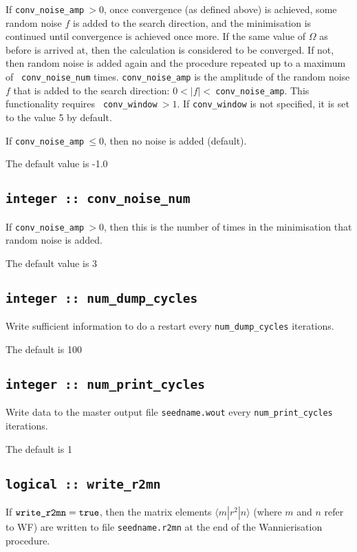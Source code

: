 If {\tt conv\_noise\_amp}$\:>0$, once convergence (as defined above) is
achieved, some random noise $f$ is added to the search direction, and the
minimisation is continued until convergence is achieved once more. If
the same value of $\Omega$ as before is arrived at, then the calculation
is considered to be converged. If not, then random noise is added
again and the procedure repeated up to a maximum of {\tt
  conv\_noise\_num} times. {\tt conv\_noise\_amp} is the amplitude of
the random noise $f$ that is added to the search direction:
$0 < |f| <\:${\tt conv\_noise\_amp}. This functionality requires {\tt
  conv\_window}$\:>1$. If {\tt conv\_window} is not specified, it is set
to the value 5 by default.

If {\tt conv\_noise\_amp}$\:\leq 0$, then no noise is added (default).

The default value is -1.0

\subsection[conv\_noise\_num]{\tt integer :: conv\_noise\_num}

If {\tt conv\_noise\_amp}$\:>0$, then this is the number of times in the
minimisation that random noise is added.

The default value is 3

\subsection[num\_dump\_cycles]{\tt integer :: num\_dump\_cycles}
Write sufficient information to do a restart every
\verb#num_dump_cycles# iterations.

The default is 100

\subsection[num\_print\_cycles]{\tt integer :: num\_print\_cycles}
Write data to the master output file {\tt seedname.wout} every
\verb#num_print_cycles# iterations.

The default is 1

\subsection[write\_r2mn]{\tt logical :: write\_r2mn}

If $\verb#write_r2mn#=\verb#true#$, then the matrix elements
$\langle m|r^2|n\rangle$ (where $m$ and $n$ refer to WF) are written
to file \verb#seedname.r2mn# at the end of the Wannierisation
procedure.

